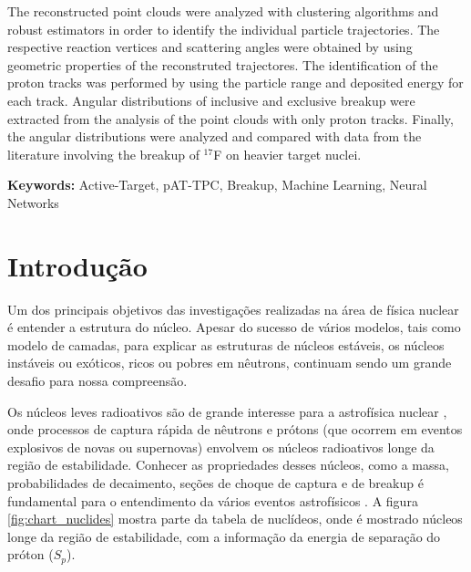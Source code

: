 \documentclass[a4paper,12pt,oneside]{book}
\begin{document}
\par The reconstructed point clouds were analyzed with clustering algorithms and robust estimators in order to identify the individual particle trajectories. The respective reaction vertices and scattering angles were obtained by using geometric properties of the reconstruted trajectores. The identification of the proton tracks was performed by using the particle range and deposited energy for each track. Angular distributions of inclusive and exclusive breakup were extracted from the analysis of the point clouds with only proton tracks. Finally, the angular distributions were analyzed and compared with data from the literature involving the breakup of $^{17}$F on heavier target nuclei.
\par \textbf{Keywords:} Active-Target, pAT-TPC, Breakup, Machine Learning, Neural Networks

\newpage

\tableofcontents
\thispagestyle{empty}
\newpage



\chapter{Introdução}

\par Um dos principais objetivos das investigações realizadas na área de física nuclear é entender a estrutura do núcleo. Apesar do sucesso de vários modelos, tais como modelo de camadas, para explicar as estruturas de núcleos estáveis, os núcleos instáveis ou exóticos, ricos ou pobres em nêutrons, continuam sendo um grande desafio para nossa compreensão.

\par Os núcleos leves radioativos são de grande interesse para a astrofísica nuclear \cite{BARDAYAN2017415}, onde processos de captura rápida de nêutrons e prótons (que ocorrem em eventos explosivos de novas ou supernovas) envolvem os núcleos radioativos longe da região de estabilidade. Conhecer as propriedades desses núcleos, como a massa, probabilidades de decaimento, seções de choque de captura e de breakup é fundamental para o entendimento da vários eventos astrofísicos \cite{BARDAYAN2017415, 10.3389/fphy.2020.602920}. A figura \ref{fig:chart_nuclides} mostra parte da tabela de nuclídeos, onde é mostrado núcleos longe da região de estabilidade, com a informação da energia de separação do próton ($S_p$).
\end{document}
